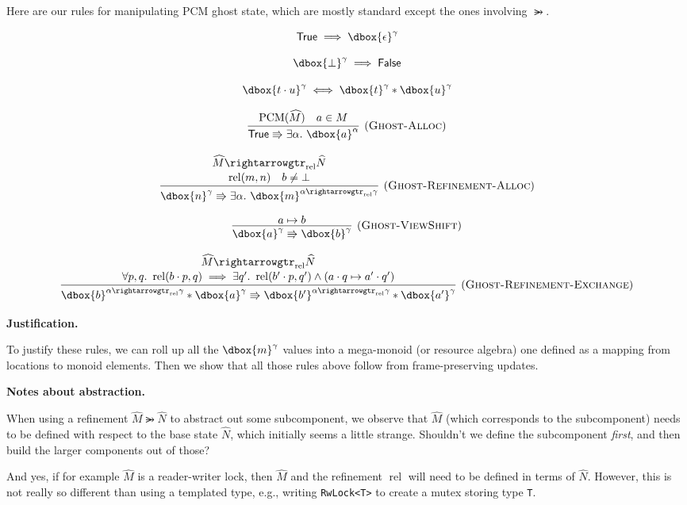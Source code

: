 \documentclass{article}
\newcommand{\einfer}[3]
        {\infer[(\textsc{#1})]{#3}{#2}}
\newcommand{\stacktwo}[2]{\stackanchor{\ensuremath{#1}}{\ensuremath{#2}}}
\newcommand\dboxed[1]{\dbox{\vphantom{t}\ensuremath{#1}}}
\newcommand{\viewshift}{\Rrightarrow}
\newcommand{\unit}{\epsilon}
\newcommand{\true}{\textsf{True}}
\newcommand{\false}{\textsf{False}}
\DeclareMathOperator{\rel}{rel}
\DeclareMathOperator{\PCM}{PCM}
\newcommand{\refines}{\rightarrowgtr}
\begin{document}
Here are our rules for manipulating PCM ghost state, which are mostly standard except
the ones involving $\refines$.

\[
  \true \implies \dboxed{\unit}^\gamma
\]

\[
  \dboxed{\bot}^\gamma \implies \false
\]

\[
  \dboxed{t\cdot u}^\gamma\iff\dboxed{t}^\gamma * \dboxed{u}^\gamma
\]

\[
  \einfer{Ghost-Alloc}{
    \PCM(\widehat{M}) \quad a\in M
  }{
    \true \viewshift \exists\alpha.~ \dboxed{a}^\alpha
  }
\]

\[
  \einfer{Ghost-Refinement-Alloc}{
    \stacktwo{
      \widehat{M} \refines_{\rel} \widehat{N}
    }{
      \rel(m, n) \quad b \ne \bot
    }
  }{
    \dboxed{n}^\gamma \viewshift \exists \alpha.~ \dboxed{m}^{\alpha \refines_{\rel} \gamma}
  }
\]

\[
  \einfer{Ghost-ViewShift}{
    a \mapsto b
  }{
    \dboxed{a}^\gamma \viewshift \dboxed{b}^\gamma
  }
\]

\[
  \einfer{Ghost-Refinement-Exchange}{
    \stacktwo{
      \widehat{M} \refines_{\rel} \widehat{N}
    }{
      \forall p,q.~ \rel(b\cdot p, q) \implies \exists q' .~ \rel(b' \cdot p, q') \land (a \cdot q \mapsto a' \cdot q')
    }
  }{
    \dboxed{b}^{\alpha \refines_{\rel} \gamma} * \dboxed{a}^\gamma
      \viewshift
    \dboxed{b'}^{\alpha \refines_{\rel} \gamma} * \dboxed{a'}^\gamma
  }
\]

\textbf{Justification.}

To justify these rules, we can roll up all the $\dboxed{m}^\gamma$ values into a mega-monoid (or resource algebra)
one defined as a mapping from locations to monoid elements.
Then we show that all those rules above follow from frame-preserving updates.

\textbf{Notes about abstraction.}

When using a refinement
$\widehat{M} \refines \widehat{N}$
to abstract out some subcomponent, we observe that $\widehat{M}$ (which corresponds to the subcomponent) needs to be defined with respect to the base state $\widehat{N}$,
which initially seems a little strange. Shouldn't we define the subcomponent \emph{first}, and then build the larger components out of those?

And yes, if for example $\widehat{M}$ is a reader-writer lock, then $\widehat{M}$ and the refinement $\rel$ will need to be defined in terms of $\widehat{N}$. However, this is not really so different than using a templated type, e.g., writing \texttt{RwLock<T>} to create a mutex storing type \texttt{T}.
\end{document}
